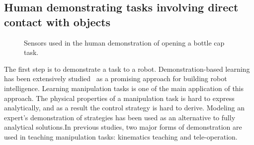 \subsection{Human demonstrating tasks involving direct contact with objects}
\label{cha4:sec2:demo}


\begin{figure}
  \centering
    \caption{\scriptsize{Sensors used in the human demonstration of opening a bottle cap task.}}
  \label{fig:devices}
\end{figure}


The first step is to demonstrate a task to a robot. Demonstration-based learning has been extensively studied~\citep{calinon2007learning,dillmann2004teaching,kulic2012incremental}
as a promising approach for building robot
intelligence. %
Learning manipulation tasks is one of the main application of this
approach. The physical properties of a manipulation task is hard to
express analytically, and as a result the control strategy is hard to derive. Modeling an expert's demonstration
of strategies has been used as an alternative to fully analytical
solutions.In previous studies, two major forms of demonstration are used in teaching manipulation tasks: kinematics teaching and tele-operation.

